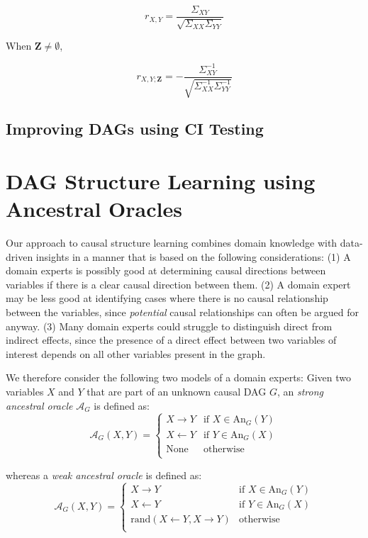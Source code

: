 \documentclass{uai2025} %
\begin{document}
\begin{equation}
	r_{X, Y} = \frac{\Sigma_{XY}}{\sqrt{\Sigma_{XX} \Sigma_{YY}}}
\end{equation}

When $ \bm{Z} \neq \emptyset $, 

\begin{equation}
	r_{X, Y; \bm{Z}} = - \frac{\Sigma^{-1}_{XY}}{\sqrt{\Sigma^{-1}_{XX} \Sigma^{-1}_{YY}}}
\end{equation}

\subsection{Improving DAGs using CI Testing}


\section{DAG Structure Learning using Ancestral Oracles}
\label{sec:modification}

Our approach to causal structure learning combines domain knowledge with data-driven
insights in a manner that is based on the following considerations: 
(1) A domain experts is possibly good at determining causal directions between variables if 
there is a clear causal direction between them. (2) A domain expert may be less good
at identifying cases where there is no causal relationship between the variables,
since \emph{potential} causal relationships can often be argued for anyway.
(3) Many domain experts could struggle to distinguish direct from indirect 
effects, since the presence of a direct effect between two variables
of interest depends on all other variables present in the graph. 

We therefore consider the following two models of a domain experts: Given two variables
$ X $ and $ Y $ that are part of an unknown causal DAG $G$, an \emph{strong ancestral oracle} 
$\mathcal{A}_G$ is defined as:
$$\mathcal{A}_G(X,Y)=\begin{cases}
 X \to Y & \textrm{if } X \in \textrm{An}_G(Y) \\
 X \gets Y & \textrm{if } Y \in \textrm{An}_G(X) \\
 \textrm{None} & \textrm{otherwise} \\
\end{cases}$$

whereas a \emph{weak ancestral oracle} is defined as:
$$
\mathcal{A}_G(X,Y)=\begin{cases}
 X \to Y & \textrm{if } X \in \textrm{An}_G(Y) \\
 X \gets Y & \textrm{if } Y \in \textrm{An}_G(X) \\
 \textrm{rand}(X \gets Y, X \to Y) & \textrm{otherwise} \\
\end{cases}
$$
\end{document}
